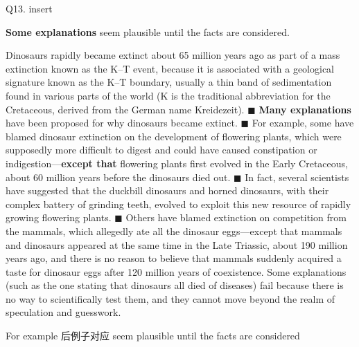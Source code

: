 \begin{blk}
    \begin{qst}
        Q13. insert

        \textbf{Some explanations} seem plausible until the facts are considered.
    \end{qst}

    \begin{psgq}
        Dinosaurs rapidly became extinct about 65 million years ago as part of a mass extinction known as the K–T event, because it is associated with a geological signature known as the K–T boundary, usually a thin band of sedimentation found in various parts of the world (K is the traditional abbreviation for the Cretaceous, derived from the German name Kreidezeit). $\blacksquare$ \textbf{Many explanations} have been proposed for why dinosaurs became extinct. $\blacksquare$ For example, some have blamed dinosaur extinction on the development of flowering plants, which were supposedly more difficult to digest and could have caused constipation or indigestion—\textbf{except that} flowering plants first evolved in the Early Cretaceous, about 60 million years before the dinosaurs died out. $\blacksquare$ In fact, several scientists have suggested that the duckbill dinosaurs and horned dinosaurs, with their complex battery of grinding teeth, evolved to exploit this new resource of rapidly growing flowering plants. $\blacksquare$ Others have blamed extinction on competition from the mammals, which allegedly ate all the dinosaur eggs—except that mammals and dinosaurs appeared at the same time in the Late Triassic, about 190 million years ago, and there is no reason to believe that mammals suddenly acquired a taste for dinosaur eggs after 120 million years of coexistence. Some explanations (such as the one stating that dinosaurs all died of diseases) fail because there is no way to scientifically test them, and they cannot move beyond the realm of speculation and guesswork.
    \end{psgq}

    \begin{nlz}
        For example 后例子对应 seem plausible until the facts are considered
    \end{nlz}
\end{blk}

\newpage